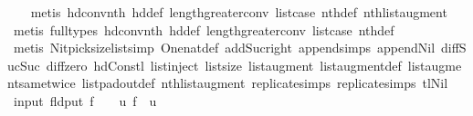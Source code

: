 \begin{isabellebody}
\ \ \isamarkupfalse%
\ {\isacharparenleft}metis\ hd{\isacharunderscore}conv{\isacharunderscore}nth\ hd{\isacharunderscore}def\ length{\isacharunderscore}greater{\isacharunderscore}{}{\isacharunderscore}conv\ list{\isachardot}case{\isacharparenleft}{}{\isacharparenright}\ nth{\isacharprime}{\isacharunderscore}def\ nth{\isacharprime}{\isacharunderscore}list{\isacharunderscore}augment{\isacharparenright}\isanewline
\ \ \isamarkupfalse%
\ {\isacharparenleft}metis\ {\isacharparenleft}full{\isacharunderscore}types{\isacharparenright}\ hd{\isacharunderscore}conv{\isacharunderscore}nth\ hd{\isacharunderscore}def\ length{\isacharunderscore}greater{\isacharunderscore}{}{\isacharunderscore}conv\ list{\isachardot}case{\isacharparenleft}{}{\isacharparenright}\ nth{\isacharprime}{\isacharunderscore}def{\isacharparenright}\isanewline
\ \ \isamarkupfalse%
\ {\isacharparenleft}metis\ Nitpick{\isachardot}size{\isacharunderscore}list{\isacharunderscore}simp{\isacharparenleft}{}{\isacharparenright}\ One{\isacharunderscore}nat{\isacharunderscore}def\ add{\isacharunderscore}Suc{\isacharunderscore}right\ append{\isachardot}simps{\isacharparenleft}{}{\isacharparenright}\ append{\isacharunderscore}Nil{}\ diff{\isacharunderscore}Suc{\isacharunderscore}Suc\ diff{\isacharunderscore}zero\ hd{\isacharunderscore}Cons{\isacharunderscore}tl\ list{\isachardot}inject\ list{\isachardot}size{\isacharparenleft}{}{\isacharparenright}\ list{\isacharunderscore}augment{\isacharunderscore}{}\ list{\isacharunderscore}augment{\isacharunderscore}def\ list{\isacharunderscore}augment{\isacharunderscore}same{\isacharunderscore}twice\ list{\isacharunderscore}pad{\isacharunderscore}out{\isacharunderscore}def\ nth{\isacharunderscore}list{\isacharunderscore}augment\ replicate{\isachardot}simps{\isacharparenleft}{}{\isacharparenright}\ replicate{\isachardot}simps{\isacharparenleft}{}{\isacharparenright}\ tl{\isacharunderscore}Nil{\isacharparenright}\isanewline
{}\isamarkupfalse%
%
\endisatagproof
{\isafoldproof}%
%
\isadelimproof
%
\endisadelimproof
%
\isamarkuptrue%
\isamarkupfalse%
\ {\isacharparenleft}input{\isacharparenright}\ {\isachardoublequoteopen}fld{\isacharunderscore}put\ f\ {\isasymequiv}\ {\isacharparenleft}{\isasymlambda}\ {\isasymsigma}\ u{\isachardot}\ f\ {\isacharparenleft}{\isasymlambda}{\isacharunderscore}{\isachardot}\ u{\isacharparenright}\ {\isasymsigma}{\isacharparenright}{\isachardoublequoteclose}\isanewline

\end{isabellebody}
